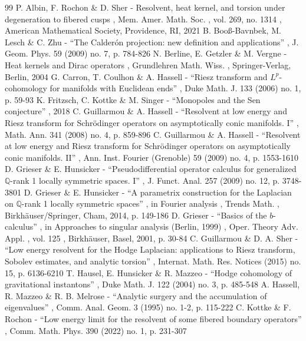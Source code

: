\documentclass[11pt]{article}
\numberwithin{equation}{section}
\theoremstyle{plain}
\theoremstyle{definition}
\begin{document}
\begin{thebibliography}{99}
 P. Albin, F. Rochon \& D. Sher - Resolvent, heat kernel, and torsion under degeneration to fibered cusps , Mem. Amer. Math. Soc. , vol. 269, no. 1314 , American Mathematical Society, Providence, RI, 2021
 B. Booß-Bavnbek, M. Lesch \& C. Zhu - “The Calderón projection: new definition and applications” , J. Geom. Phys. 59 (2009) no. 7, p. 784-826
 N. Berline, E. Getzler \& M. Vergne - Heat kernels and Dirac operators , Grundlehren Math. Wiss. , Springer-Verlag, Berlin, 2004
 G. Carron, T. Coulhon \& A. Hassell - “Riesz transform and $L^p$-cohomology for manifolds with Euclidean ends” , Duke Math. J. 133 (2006) no. 1, p. 59-93
 K. Fritzsch, C. Kottke \& M. Singer - “Monopoles and the Sen conjecture” , 2018
 C. Guillarmou \& A. Hassell - “Resolvent at low energy and Riesz transform for Schrödinger operators on asymptotically conic manifolds. I” , Math. Ann. 341 (2008) no. 4, p. 859-896
 C. Guillarmou \& A. Hassell - “Resolvent at low energy and Riesz transform for Schrödinger operators on asymptotically conic manifolds. II” , Ann. Inst. Fourier (Grenoble) 59 (2009) no. 4, p. 1553-1610
 D. Grieser \& E. Hunsicker - “Pseudodifferential operator calculus for generalized $\mathbb{Q}$-rank 1 locally symmetric spaces. I” , J. Funct. Anal. 257 (2009) no. 12, p. 3748-3801
 D. Grieser \& E. Hunsicker - “A parametrix construction for the Laplacian on $\mathbb{Q}$-rank 1 locally symmetric spaces” , in Fourier analysis , Trends Math. , Birkhäuser/Springer, Cham, 2014, p. 149-186
 D. Grieser - “Basics of the $b$-calculus” , in Approaches to singular analysis (Berlin, 1999) , Oper. Theory Adv. Appl. , vol. 125 , Birkhäuser, Basel, 2001, p. 30-84
 C. Guillarmou \& D. A. Sher - “Low energy resolvent for the Hodge Laplacian: applications to Riesz transform, Sobolev estimates, and analytic torsion” , Internat. Math. Res. Notices (2015) no. 15, p. 6136-6210
 T. Hausel, E. Hunsicker \& R. Mazzeo - “Hodge cohomology of gravitational instantons” , Duke Math. J. 122 (2004) no. 3, p. 485-548
 A. Hassell, R. Mazzeo \& R. B. Melrose - “Analytic surgery and the accumulation of eigenvalues” , Comm. Anal. Geom. 3 (1995) no. 1-2, p. 115-222
 C. Kottke \& F. Rochon - “Low energy limit for the resolvent of some fibered boundary operators” , Comm. Math. Phys. 390 (2022) no. 1, p. 231-307

\end{thebibliography}
\end{document}
